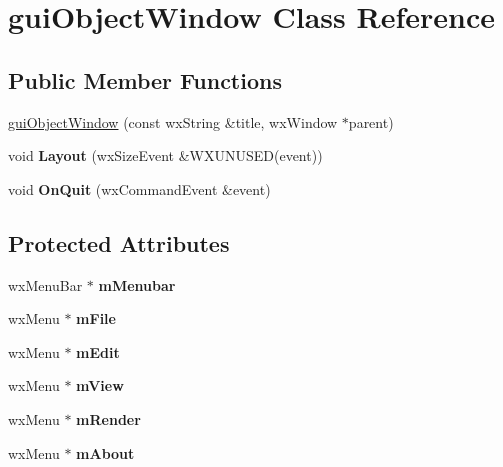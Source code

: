 \hypertarget{classgui_object_window}{
\section{guiObjectWindow Class Reference}
\label{classgui_object_window}
}
\subsection*{Public Member Functions}
\begin{DoxyCompactItemize}
\item 
\hyperlink{classgui_object_window_adbde6fa2d8c520916ed396bac926fc0d}{guiObjectWindow} (const wxString \&title, wxWindow $\ast$parent)
\item 
\hypertarget{classgui_object_window_a384e0e5a53208679b5ad3f3ec88dcecf}{
void {\bfseries Layout} (wxSizeEvent \&WXUNUSED(event))}
\label{classgui_object_window_a384e0e5a53208679b5ad3f3ec88dcecf}

\item 
\hypertarget{classgui_object_window_a3dce6bb59984ce7351d6f2610bd720bf}{
void {\bfseries OnQuit} (wxCommandEvent \&event)}
\label{classgui_object_window_a3dce6bb59984ce7351d6f2610bd720bf}

\end{DoxyCompactItemize}
\subsection*{Protected Attributes}
\begin{DoxyCompactItemize}
\item 
\hypertarget{classgui_object_window_a5aa537be6d8e711f34a262aba2c6aebe}{
wxMenuBar $\ast$ {\bfseries mMenubar}}
\label{classgui_object_window_a5aa537be6d8e711f34a262aba2c6aebe}

\item 
\hypertarget{classgui_object_window_ab18e98206cb30da664aa978cd1af9d3d}{
wxMenu $\ast$ {\bfseries mFile}}
\label{classgui_object_window_ab18e98206cb30da664aa978cd1af9d3d}

\item 
\hypertarget{classgui_object_window_aa0f98b0a5ca7b07fbb97acc335d27f25}{
wxMenu $\ast$ {\bfseries mEdit}}
\label{classgui_object_window_aa0f98b0a5ca7b07fbb97acc335d27f25}

\item 
\hypertarget{classgui_object_window_ae6647753add10b0b5543e1dd393c29d6}{
wxMenu $\ast$ {\bfseries mView}}
\label{classgui_object_window_ae6647753add10b0b5543e1dd393c29d6}

\item 
\hypertarget{classgui_object_window_a403c9df6a79b1c675a50dbe14fcfdb12}{
wxMenu $\ast$ {\bfseries mRender}}
\label{classgui_object_window_a403c9df6a79b1c675a50dbe14fcfdb12}

\item 
\hypertarget{classgui_object_window_a1bf8e953cf32401cf4dd89ecbbcea497}{
wxMenu $\ast$ {\bfseries mAbout}}
\label{classgui_object_window_a1bf8e953cf32401cf4dd89ecbbcea497}

\end{DoxyCompactItemize}


